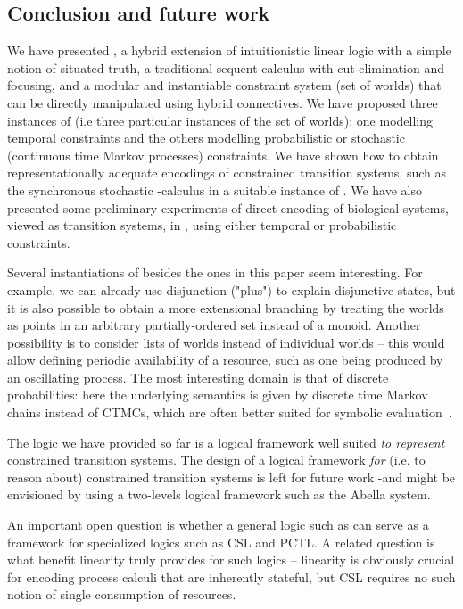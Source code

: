 \documentclass{article}
\begin{document}
\begin{lem}
\section{Conclusion and future work}
\label{sec:concl}

We have presented \hyll, a hybrid extension of intuitionistic linear logic with
a simple notion of situated truth, a traditional sequent calculus with
cut-elimination and focusing, and a modular and instantiable constraint system
(set of worlds) that can be directly manipulated using hybrid connectives.
We have proposed three instances of \hyll
(i.e three particular instances of the set of worlds):
one modelling temporal constraints and the others modelling probabilistic
or stochastic (continuous time Markov processes) constraints.
We have shown how to obtain representationally adequate encodings of constrained
transition systems, such as the synchronous stochastic -calculus in a suitable
instance of \hyll.
We have also presented some preliminary experiments of direct encoding of biological 
systems, viewed as transition systems, in \hyll, using either temporal or probabilistic 
constraints.

Several instantiations of \hyll besides the ones in this paper seem
interesting. For example, we can already use disjunction ("plus") to explain
disjunctive states, but it is also possible to obtain a more extensional
branching by treating the worlds as points in an arbitrary partially-ordered set
instead of a monoid. Another possibility is to consider lists of worlds instead
of individual worlds -- this would allow defining periodic availability of a
resource, such as one being produced by an oscillating process. The most
interesting domain is that of discrete probabilities: here the underlying
semantics is given by discrete time Markov chains instead of CTMCs, which are
often better suited for symbolic evaluation~\cite{wu07qest}.

The logic we have provided so far is a logical framework well suited {\it to represent}
constrained transition systems. The design of a logical framework {\it for}
(i.e. to reason about) constrained transition systems is left for future work
-and might be envisioned by using a two-levels logical framework such as the Abella system.

An important open question is whether a general logic such as \hyll can serve as
a framework for specialized logics such as CSL and PCTL. A related question is
what benefit linearity truly provides for such logics -- linearity is obviously
crucial for encoding process calculi that are inherently stateful, but CSL
requires no such notion of single consumption of resources.


\end{lem}
\end{document}
